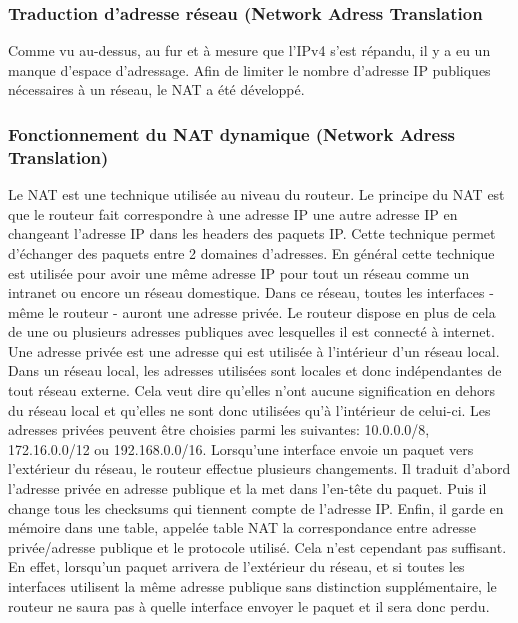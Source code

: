 \subsubsection{Traduction d'adresse réseau (Network Adress Translation}
\label{sec:nat}
Comme vu au-dessus, au fur et à mesure que l'IPv4 s'est répandu, il y a eu un manque
d'espace d'adressage. Afin de limiter le nombre d'adresse IP publiques nécessaires
à un réseau, le NAT a été développé.

\subsubsection{Fonctionnement du NAT dynamique (Network Adress Translation)}
Le NAT est une technique utilisée au niveau du routeur. Le principe du NAT est
que le routeur fait correspondre à une adresse IP une autre adresse IP en
changeant l'adresse IP dans les headers des paquets IP. Cette technique permet
d'échanger des paquets entre 2 domaines d'adresses. En général cette technique
est utilisée pour avoir une même adresse IP pour tout un réseau comme un 
intranet ou encore un réseau domestique. Dans ce réseau, toutes les interfaces
- même le routeur - auront une adresse privée. Le routeur dispose en plus de
cela de une ou plusieurs adresses publiques avec lesquelles il est connecté à
internet. Une adresse privée est une adresse qui est utilisée à l'intérieur
d'un réseau local. Dans un réseau local, les adresses utilisées sont locales et donc
indépendantes de tout réseau externe. Cela veut dire qu'elles n'ont aucune
signification en dehors du réseau local et qu'elles ne sont donc utilisées qu'à
l'intérieur de celui-ci. Les adresses privées peuvent être choisies parmi les
suivantes: 10.0.0.0/8, 172.16.0.0/12 ou 192.168.0.0/16.
\smallbreak
Lorsqu'une interface envoie un paquet vers l'extérieur du réseau, le routeur
effectue plusieurs changements. Il traduit d'abord l'adresse privée en adresse
publique et la met dans l'en-tête du paquet. Puis il change tous les checksums
qui tiennent compte de l'adresse IP. Enfin, il garde en mémoire dans une table,
 appelée table NAT la correspondance entre adresse privée/adresse publique et le
protocole utilisé.
\newline
Cela n'est cependant pas suffisant. En effet, lorsqu'un paquet arrivera de
l'extérieur du réseau, et si toutes les interfaces utilisent la même adresse
publique sans distinction supplémentaire, le routeur ne saura pas à quelle
interface envoyer le paquet et il sera donc perdu.


